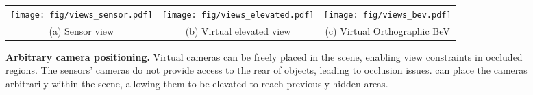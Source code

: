 \begin{figure*}
    \centering
    \small
    \setlength{\tabcolsep}{16pt}
    \begin{tabular}{ccc}
         \texttt{[image: fig/views\_sensor.pdf]}&
         \texttt{[image: fig/views\_elevated.pdf]}&
         \texttt{[image: fig/views\_bev.pdf]} \\
         (a) Sensor view &
         (b) Virtual elevated view &
         (c) Virtual Orthographic BeV
    \end{tabular}
    \caption{\textbf{Arbitrary camera positioning.} Virtual cameras can be freely placed in the scene, enabling view constraints in occluded regions. The sensors' cameras do not provide access to the rear of objects, leading to occlusion issues. \method{} can place the cameras arbitrarily within the scene, allowing them to be elevated to reach previously hidden areas.}
    \label{fig:camera_location}
\end{figure*}
